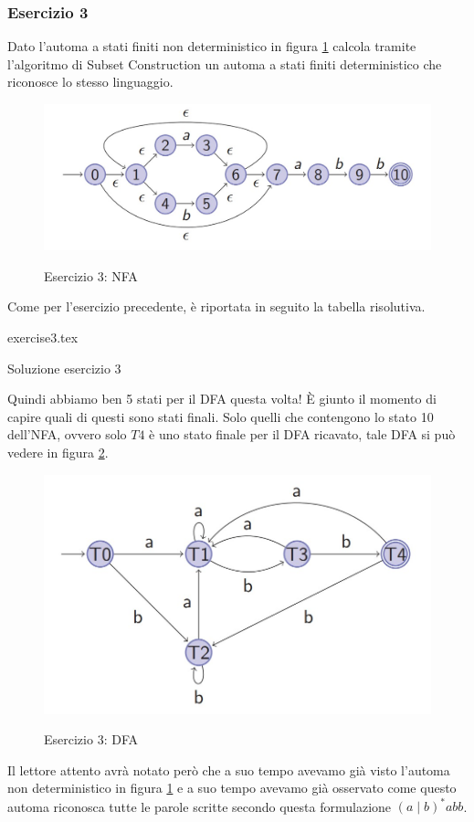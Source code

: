 \documentclass[class=book, crop=false, oneside, 12pt]{standalone}
\begin{document}
\subsubsection*{Esercizio 3}
Dato l'automa a stati finiti non deterministico in figura \ref{es_sc_3} calcola tramite l'algoritmo di Subset Construction un automa a stati finiti deterministico che riconosce lo stesso linguaggio.
\begin{figure}[H]
    \centering
    \includegraphics[width=.8\textwidth,keepaspectratio]{e3_subset_construction.jpg}
    \label{es_sc_3}
    \caption{Esercizio 3: NFA}
\end{figure}
Come per l'esercizio precedente, è riportata in seguito la tabella risolutiva.
\begin{table}[H]
	\centering
	{exercise3.tex}
    \caption{Soluzione esercizio 3}
    \label{Esercizio 3}
\end{table}
Quindi abbiamo ben 5 stati per il DFA questa volta! È giunto il momento di capire quali di questi sono stati finali. Solo quelli che contengono lo stato 10 dell'NFA, ovvero solo \(T4\) è uno stato finale per il DFA ricavato, tale DFA si può vedere in figura \ref{sol_sc_3}.
\begin{figure}[H]
    \centering
    \includegraphics[width=.8\textwidth,keepaspectratio]{s3_subset_construction.jpg}
    \label{sol_sc_3}
    \caption{Esercizio 3: DFA}
\end{figure}

Il lettore attento avrà notato però che a suo tempo avevamo già visto l'automa non deterministico in figura \ref{es_sc_3} e a suo tempo avevamo già osservato come questo automa riconosca tutte le parole scritte secondo questa formulazione \((a \mid b)^* abb\).
\end{document}
